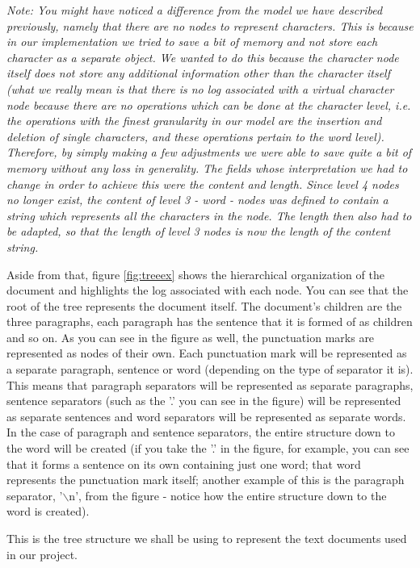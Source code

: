 \emph{Note: You might have noticed a difference from the model we have described previously, namely that
there are no nodes to represent characters. This is because in our implementation we tried to
save a bit of memory and not store each character as a separate object. We wanted to do this
because the character node itself does not store any additional information other than the character
itself (what we really mean is that there is no log associated with a virtual character node because
there are no operations which can be done at the character level, i.e. the operations with the finest
granularity in our model are the insertion and deletion of single characters, and these operations
pertain to the word level). Therefore, by simply making a few adjustments we were able to save quite
a bit of memory without any loss in generality. The fields whose interpretation we had to change
in order to achieve this were the \emph{content} and \emph{length}. Since level 4 nodes no longer
exist, the \emph{content} of level 3 - word - nodes was defined to contain a string which represents
all the characters in the node. The \emph{length} then also had to be adapted, so that the length
of level 3 nodes is now the length of the content string.}

Aside from that, figure \ref{fig:treeex} shows the hierarchical organization of the document and highlights
the log associated with each node. You can see that the root of the tree represents the document
itself. The document's children are the three paragraphs, each paragraph has the sentence that it
is formed of as children and so on. As you can see in the figure as well, the punctuation marks
are represented as nodes of their own. Each punctuation mark will be represented as a separate
paragraph, sentence or word (depending on the type of separator it is). This means that paragraph
separators will be represented as separate paragraphs, sentence separators (such as the '.' you
can see in the figure) will be represented as separate sentences and word separators will be
represented as separate words. In the case of paragraph and sentence separators, the entire
structure down to the word will be created (if you take the '.' in the figure, for example, you
can see that it forms a sentence on its own containing just one word; that word represents the
punctuation mark itself; another example of this is the paragraph separator, '$\backslash$n',
from the figure - notice how the entire structure down to the word is created).

This is the tree structure we shall be using to represent the text documents used in our project.

